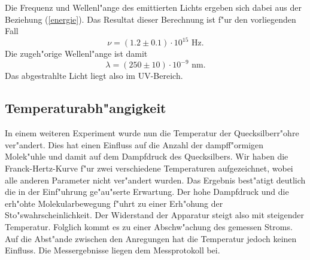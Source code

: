 \documentclass[a4paper,10pt]{article}
\begin{document}
Die Frequenz und Wellenl"ange des emittierten Lichts ergeben sich dabei aus der Beziehung (\ref{energie}). Das Resultat dieser Berechnung ist f"ur den vorliegenden Fall
$$
\nu = (1.2 \pm 0.1) \cdot 10^{15} \text{ Hz}.
$$
Die zugeh"orige Wellenl"ange ist damit
$$
\lambda = (250 \pm 10) \cdot 10^{-9} \text{ nm}.
$$
Das abgestrahlte Licht liegt also im UV-Bereich.

\subsection{Temperaturabh"angigkeit}
In einem weiteren Experiment wurde nun die Temperatur der Quecksilberr"ohre ver"andert. Dies hat einen Einfluss auf die Anzahl der dampff"ormigen Molek"uhle und damit auf dem Dampfdruck des Quecksilbers. Wir haben die Franck-Hertz-Kurve f"ur zwei verschiedene Temperaturen aufgezeichnet, wobei alle anderen Parameter nicht ver"andert wurden. Das Ergebnis best"atigt deutlich die in der Einf"uhrung ge"au"serte Erwartung. Der hohe Dampfdruck und die erh"ohte Molekularbewegung f"uhrt zu einer Erh"ohung der Sto"swahrscheinlichkeit. Der Widerstand der Apparatur steigt also mit steigender Temperatur. Folglich kommt es zu einer Abschw"achung des gemessen Stroms. Auf die Abst"ande zwischen den Anregungen hat die Temperatur jedoch keinen Einfluss. Die Messergebnisse liegen dem Messprotokoll bei.
\end{document}
